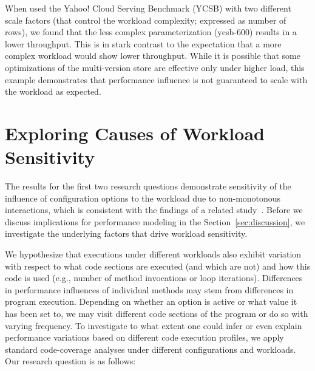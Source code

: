 {{{{{\color{red}
	When used the Yahoo! Cloud Serving Benchmark (YCSB) with two different scale factors (that control the workload complexity; expressed as number of rows), we found that the less complex parameterization (\textsf{ycsb-600}) results in a lower throughput. 
}
	This is in stark contrast to the expectation that a more complex workload would show lower throughput. While it is possible that some optimizations of the multi-version store are effective only under higher load, this example demonstrates that performance influence is not guaranteed to scale with the workload as expected. 

}

\label{sec:rq3}\label{sec:categories}
\section{Exploring Causes of Workload Sensitivity}\label{sec:new_section}
The results for the first two research questions demonstrate sensitivity of the influence of configuration options to the workload due to non-monotonous interactions, which is consistent with the findings of a related study~\cite{lesoil_2021}. Before we discuss implications for performance modeling in the Section~\ref{sec:discussion}, we investigate the underlying factors that drive workload sensitivity.

We hypothesize that executions under different workloads also exhibit variation with respect to what code sections are executed (and which are not) and how this code is used (e.g., number of method invocations or loop iterations). Differences in performance influences of individual methods may stem from differences in program execution. Depending on whether an option is active or what value it has been set to, we may visit different code sections of the program or do so with varying frequency.
To investigate to what extent one could infer or even explain performance variations based on different code execution profiles, we apply standard code-coverage analyses under different configurations and workloads. Our research question is as follows:


}}}
